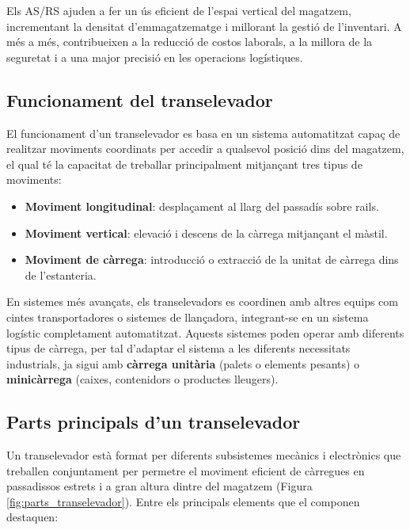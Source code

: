 \documentclass[a4paper,11pt,DIV=13,headings=normal,abstract=true,twoside=semi]{article}
\newcommand{\acro}[1]{\textsc{#1}}
\begin{document}
Els \acro{AS/RS} ajuden a fer un ús eficient de l'espai vertical del magatzem, incrementant la densitat d'emmagatzematge i millorant la gestió de l'inventari. A més a més, contribueixen a la reducció de costos laborals, a la millora de la seguretat i a una major precisió en les operacions logístiques.

\subsection{Funcionament del transelevador}

El funcionament d'un transelevador \cite{transelevador_info} es basa en un sistema automatitzat capaç de realitzar moviments coordinats per accedir a qualsevol posició dins del magatzem, el qual té la capacitat de treballar principalment mitjançant tres tipus de moviments:

\begin{itemize}
    \item \textbf{Moviment longitudinal}: desplaçament al llarg del passadís sobre rails.
    \item \textbf{Moviment vertical}: elevació i descens de la càrrega mitjançant el màstil.
    \item \textbf{Moviment de càrrega}: introducció o extracció de la unitat de càrrega dins de l'estanteria.
\end{itemize}

En sistemes més avançats, els transelevadors es coordinen amb altres equips com cintes transportadores o sistemes de llançadora, integrant-se en un sistema logístic completament automatitzat. Aquests sistemes poden operar amb diferents tipus de càrrega, per tal d'adaptar el sistema a les diferents necessitats industrials, ja sigui amb \textbf{càrrega unitària} (palets o elements pesants) o \textbf{minicàrrega} (caixes, contenidors o productes lleugers).

\subsection{Parts principals d'un transelevador}

Un transelevador està format per diferents subsistemes mecànics i electrònics que treballen conjuntament per permetre el moviment eficient de càrregues en passadissos estrets i a gran altura dintre del magatzem (Figura \ref{fig:parts_transelevador}).  Entre els principals elements \cite{transelevador_info} que el componen destaquen:
\end{document}
